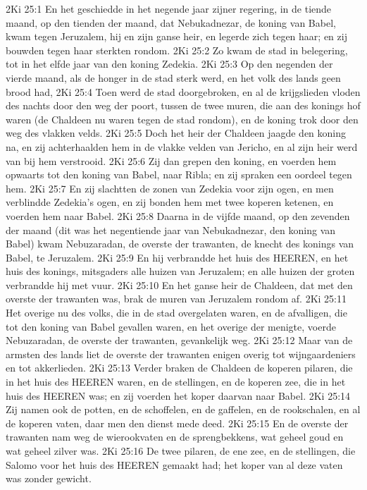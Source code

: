 2Ki 25:1  En het geschiedde in het negende jaar zijner regering, in de tiende maand, op den tienden der maand, dat Nebukadnezar, de koning van Babel, kwam tegen Jeruzalem, hij en zijn ganse heir, en legerde zich tegen haar; en zij bouwden tegen haar sterkten rondom.
2Ki 25:2  Zo kwam de stad in belegering, tot in het elfde jaar van den koning Zedekia.
2Ki 25:3  Op den negenden der vierde maand, als de honger in de stad sterk werd, en het volk des lands geen brood had,
2Ki 25:4  Toen werd de stad doorgebroken, en al de krijgslieden vloden des nachts door den weg der poort, tussen de twee muren, die aan des konings hof waren (de Chaldeen nu waren tegen de stad rondom), en de koning trok door den weg des vlakken velds.
2Ki 25:5  Doch het heir der Chaldeen jaagde den koning na, en zij achterhaalden hem in de vlakke velden van Jericho, en al zijn heir werd van bij hem verstrooid.
2Ki 25:6  Zij dan grepen den koning, en voerden hem opwaarts tot den koning van Babel, naar Ribla; en zij spraken een oordeel tegen hem.
2Ki 25:7  En zij slachtten de zonen van Zedekia voor zijn ogen, en men verblindde Zedekia's ogen, en zij bonden hem met twee koperen ketenen, en voerden hem naar Babel.
2Ki 25:8  Daarna in de vijfde maand, op den zevenden der maand (dit was het negentiende jaar van Nebukadnezar, den koning van Babel) kwam Nebuzaradan, de overste der trawanten, de knecht des konings van Babel, te Jeruzalem.
2Ki 25:9  En hij verbrandde het huis des HEEREN, en het huis des konings, mitsgaders alle huizen van Jeruzalem; en alle huizen der groten verbrandde hij met vuur.
2Ki 25:10  En het ganse heir de Chaldeen, dat met den overste der trawanten was, brak de muren van Jeruzalem rondom af.
2Ki 25:11  Het overige nu des volks, die in de stad overgelaten waren, en de afvalligen, die tot den koning van Babel gevallen waren, en het overige der menigte, voerde Nebuzaradan, de overste der trawanten, gevankelijk weg.
2Ki 25:12  Maar van de armsten des lands liet de overste der trawanten enigen overig tot wijngaardeniers en tot akkerlieden.
2Ki 25:13  Verder braken de Chaldeen de koperen pilaren, die in het huis des HEEREN waren, en de stellingen, en de koperen zee, die in het huis des HEEREN was; en zij voerden het koper daarvan naar Babel.
2Ki 25:14  Zij namen ook de potten, en de schoffelen, en de gaffelen, en de rookschalen, en al de koperen vaten, daar men den dienst mede deed.
2Ki 25:15  En de overste der trawanten nam weg de wierookvaten en de sprengbekkens, wat geheel goud en wat geheel zilver was.
2Ki 25:16  De twee pilaren, de ene zee, en de stellingen, die Salomo voor het huis des HEEREN gemaakt had; het koper van al deze vaten was zonder gewicht.

